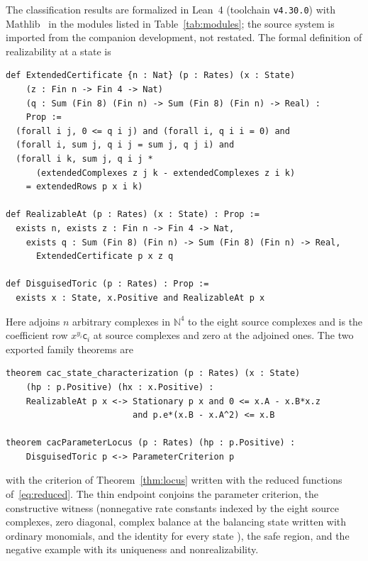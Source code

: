 \documentclass[11pt,a4paper]{article}
\theoremstyle{plain}
\theoremstyle{definition}
\theoremstyle{remark}
\newcommand{\N}{\mathbb{N}}
\newcommand{\cc}{\mathsf{c}}
\begin{document}
The classification results are formalized in Lean~4 (toolchain \texttt{v4.30.0}) with Mathlib~\cite{Lean4,Mathlib} in the modules listed in Table~\ref{tab:modules}; the source system is imported from the companion development, not restated. The formal definition of realizability at a state is
\begin{verbatim}
def ExtendedCertificate {n : Nat} (p : Rates) (x : State)
    (z : Fin n -> Fin 4 -> Nat)
    (q : Sum (Fin 8) (Fin n) -> Sum (Fin 8) (Fin n) -> Real) :
    Prop :=
  (forall i j, 0 <= q i j) and (forall i, q i i = 0) and
  (forall i, sum j, q i j = sum j, q j i) and
  (forall i k, sum j, q i j *
      (extendedComplexes z j k - extendedComplexes z i k)
    = extendedRows p x i k)

def RealizableAt (p : Rates) (x : State) : Prop :=
  exists n, exists z : Fin n -> Fin 4 -> Nat,
    exists q : Sum (Fin 8) (Fin n) -> Sum (Fin 8) (Fin n) -> Real,
      ExtendedCertificate p x z q

def DisguisedToric (p : Rates) : Prop :=
  exists x : State, x.Positive and RealizableAt p x
\end{verbatim}
Here  adjoins $n$ arbitrary complexes in $\N^4$ to the eight source complexes and  is the coefficient row $x^{y_i}\cc_i$ at source complexes and zero at the adjoined ones. The two exported family theorems are
\begin{verbatim}
theorem cac_state_characterization (p : Rates) (x : State)
    (hp : p.Positive) (hx : x.Positive) :
    RealizableAt p x <-> Stationary p x and 0 <= x.A - x.B*x.z
                         and p.e*(x.B - x.A^2) <= x.B

theorem cacParameterLocus (p : Rates) (hp : p.Positive) :
    DisguisedToric p <-> ParameterCriterion p
\end{verbatim}
with  the criterion of Theorem~\ref{thm:locus} written with the reduced functions of~\eqref{eq:reduced}. The thin endpoint  conjoins the parameter criterion, the constructive witness  (nonnegative rate constants indexed by the eight source complexes, zero diagonal, complex balance at the balancing state written with ordinary monomials, and the identity  for every state ), the safe region, and the negative example with its uniqueness and nonrealizability.
\end{document}

